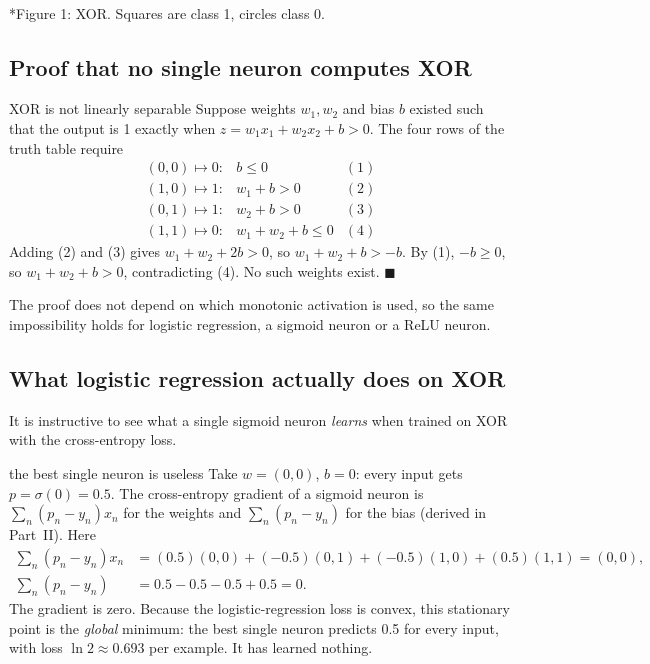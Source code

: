 \documentclass[11pt]{article}
\begin{document}
\begin{center}\\*{\small\color{GreyN}Figure 1: XOR. Squares are class 1, circles class 0.}\end{center}

\subsection{Proof that no single neuron computes XOR}
\begin{derivation}{XOR is not linearly separable}
Suppose weights $w_1,w_2$ and bias $b$ existed such that the output is 1 exactly when $z=w_1x_1+w_2x_2+b>0$. The four rows of the truth table require
\[\begin{array}{lll}
(0,0)\mapsto0: & b\le0 & (1)\\
(1,0)\mapsto1: & w_1+b>0 & (2)\\
(0,1)\mapsto1: & w_2+b>0 & (3)\\
(1,1)\mapsto0: & w_1+w_2+b\le0 & (4)
\end{array}\]
Adding (2) and (3) gives $w_1+w_2+2b>0$, so $w_1+w_2+b>-b$. By (1), $-b\ge0$, so $w_1+w_2+b>0$, contradicting (4). No such weights exist. \hfill$\blacksquare$
\end{derivation}
The proof does not depend on which monotonic activation is used, so the same impossibility holds for logistic regression, a sigmoid neuron or a ReLU neuron.

\subsection{What logistic regression actually does on XOR}\label{sec:logxor}
It is instructive to see what a single sigmoid neuron \emph{learns} when trained on XOR with the cross-entropy loss.
\begin{example}{the best single neuron is useless}
Take $w=(0,0)$, $b=0$: every input gets $p=\sigma(0)=0.5$. The cross-entropy gradient of a sigmoid neuron is $\sum_n(p_n-y_n)x_n$ for the weights and $\sum_n(p_n-y_n)$ for the bias (derived in Part~II). Here
\begin{align*}\textstyle\sum_n(p_n-y_n)x_n&=(0.5)(0,0)+(-0.5)(0,1)+(-0.5)(1,0)+(0.5)(1,1)=(0,0),\\ \textstyle\sum_n(p_n-y_n)&=0.5-0.5-0.5+0.5=0.\end{align*}
The gradient is zero. Because the logistic-regression loss is convex, this stationary point is the \emph{global} minimum: the best single neuron predicts 0.5 for every input, with loss $\ln2\approx0.693$ per example. It has learned nothing.
\end{example}
\end{document}
